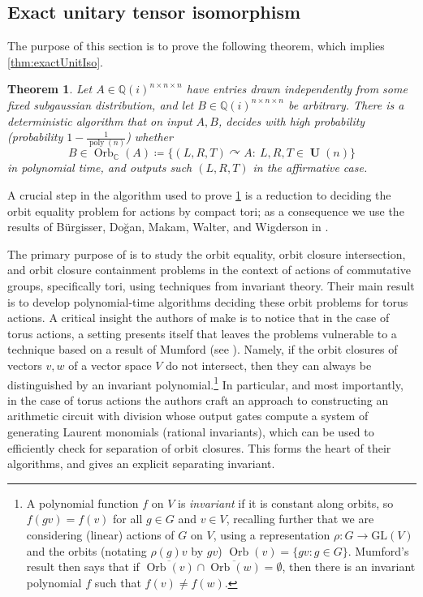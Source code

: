 \documentclass[11pt]{article}
\numberwithin{equation}{section}
\newtheorem{theorem}{Theorem}[section]
\theoremstyle{remark}
\DeclareMathOperator{\poly}{poly}
\DeclareMathOperator{\Orb}{Orb}
\DeclareMathOperator{\Unitary}{\textbf{U}}
\newcommand{\CC}{\mathbb{C}}
\newcommand{\QQ}{\mathbb{Q}}
\begin{document}
\subsection{Exact unitary tensor isomorphism}

The purpose of this section is to prove the following theorem, which implies \cref{thm:exactUnitIso}.

\begin{theorem}\label{thm:UnitIsoPrelim}
Let $A \in\QQ(i)^{n\times n\times n}$ have entries drawn independently from some fixed subgaussian distribution, and let $B \in \QQ(i)^{n\times n \times n}$ be arbitrary.
There is a deterministic algorithm that on input $A, B$, decides with high probability (probability $1-\frac{1}{\poly(n)}$) whether
\[
B\in\Orb_\CC(A)\coloneqq \{(L,R,T)\curvearrowright A:\ L,R,T\in \Unitary(n)\} 
\]
in polynomial time, and outputs such $(L,R,T)$ in the affirmative case.
\end{theorem}

A crucial step in the algorithm used to prove \cref{thm:UnitIsoPrelim} is a reduction to deciding the orbit equality problem for actions by compact tori; as a consequence we use the results of B\"urgisser, Do\u{g}an, Makam, Walter, and Wigderson in \cite{burgisser_et_alCCC.2021.32}.

The primary purpose of \cite{burgisser_et_alCCC.2021.32} is to study the orbit equality, orbit closure intersection, and orbit closure containment problems in the context of actions of commutative groups, specifically tori, using techniques from invariant theory. Their main result is to develop polynomial-time algorithms deciding these orbit problems for torus actions. 
A critical insight the authors of \cite{burgisser_et_alCCC.2021.32} make is to notice that in the case of torus actions, a setting presents itself that leaves the problems vulnerable to a technique based on a result of Mumford (see \cite{mumford1994geometric}). Namely, if the orbit closures of vectors $v, w$ of a vector space $V$ do not intersect, then they can always be distinguished by an invariant polynomial.\footnote{A polynomial function $f$ on $V$ is \emph{invariant} if it is constant along orbits, so $f(gv) = f(v)$ for all $g \in G$ and $v \in V$, recalling further that we are considering (linear) actions of $G$ on $V$, using a representation $\rho:G\rightarrow \text{GL}(V)$ and the orbits (notating $\rho(g)v$ by $gv$) $\Orb(v) = \{gv:g \in G\}$. Mumford's result then says that if $\overline{\Orb(v)}\cap \overline{\Orb(w)} = \emptyset$, then there is an invariant polynomial $f$ such that $f(v)\neq f(w)$.}
In particular, and most importantly, in the case of torus actions the authors craft an approach to constructing an arithmetic circuit with division whose output gates compute a system of generating Laurent monomials (rational invariants), which can be used to efficiently check for separation of orbit closures. This forms the heart of their algorithms, and gives an explicit separating invariant.
\end{document}
